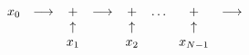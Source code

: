 \begin{align*}
\begin{array}{c c c c c c c c}
x_0 & \longrightarrow & + & \longrightarrow & + & \hdots & + & \longrightarrow\\
& &\uparrow & &\uparrow & &\uparrow\\
& &x_1 & &x_2 & &x_{N-1}
\end{array}
\end{align*}